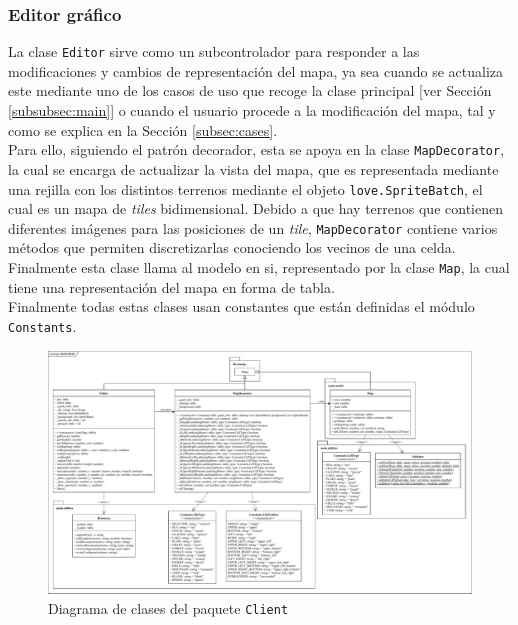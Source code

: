 \subsubsection{Editor gráfico}
\label{subsubsec:client}

La clase \texttt{Editor} sirve como un subcontrolador para responder a las modificaciones y cambios de representación del mapa, ya sea cuando se actualiza este mediante uno de los casos de uso que recoge la clase principal [ver Sección \ref{subsubsec:main}] o cuando el usuario procede a la modificación del mapa, tal y como se explica en la Sección \ref{subsec:cases}. \\

Para ello, siguiendo el patrón decorador, esta se apoya en la clase \texttt{MapDecorator}, la cual se encarga de actualizar la vista del mapa, que es representada mediante una rejilla con los distintos terrenos mediante el objeto \texttt{love.SpriteBatch}, el cual es un mapa de \textit{tiles} bidimensional. Debido a que hay terrenos que contienen diferentes imágenes para las posiciones de un \textit{tile}, \texttt{MapDecorator} contiene varios métodos que permiten discretizarlas conociendo los vecinos de una celda. Finalmente esta clase llama al modelo en si, representado por la clase \texttt{Map}, la cual tiene una representación del mapa en forma de tabla. \\

Finalmente todas estas clases usan constantes que están definidas el módulo \texttt{Constants}.

\begin{figure}
	\centering
	\includegraphics[width=\textwidth]{images/clase-editor.pdf}
	\caption{Diagrama de clases del paquete \texttt{Client}}
	\label{fig:editorclass}
\end{figure}

